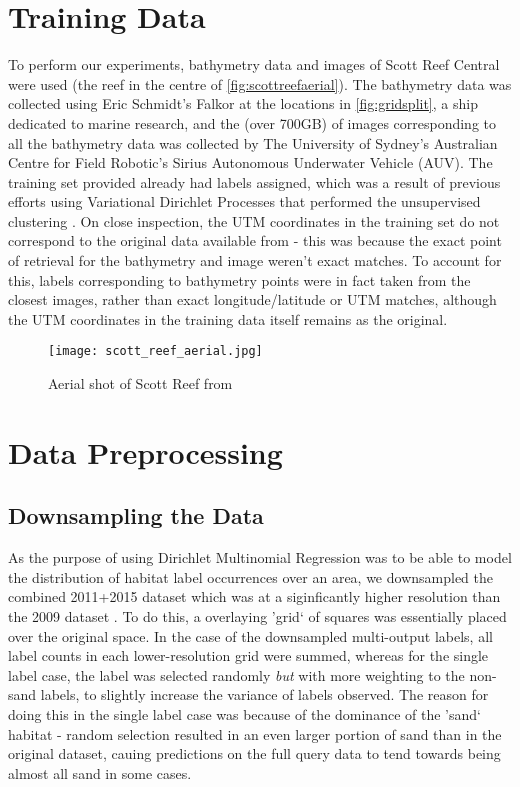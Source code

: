 \section{Training Data}
To perform our experiments, bathymetry data and images of Scott Reef Central were used (the reef in the centre of \autoref{fig:scottreefaerial}). The bathymetry data was collected using Eric Schmidt's Falkor at the locations in \autoref{fig:gridsplit}, a ship dedicated to marine research, and the (over 700GB) of images corresponding to all the bathymetry data was collected by The University of Sydney's Australian Centre for Field Robotic's Sirius Autonomous Underwater Vehicle (AUV). The training set provided already had labels assigned, which was a result of previous efforts using Variational Dirichlet Processes that performed the unsupervised clustering \citep{steinberg11}.  On close inspection, the UTM coordinates in the training set do not correspond to the original data available from \cite{squidle} - this was because the exact point of retrieval for the bathymetry and image weren't exact matches. To account for this, labels corresponding to bathymetry points were in fact taken from the closest images, rather than exact longitude/latitude or UTM matches, although the UTM coordinates in the training data itself remains as the original.


\begin{figure}
    \texttt{[image: scott\_reef\_aerial.jpg]}
    \caption{Aerial shot of Scott Reef from \cite{NASA:SRI}}
    \label{fig:scottreefaerial}
\end{figure}

\section{Data Preprocessing}

\subsection{Downsampling the Data}
As the purpose of using Dirichlet Multinomial Regression was to be able to model the distribution of habitat label occurrences over an area, we downsampled the combined 2011+2015 dataset which was at a siginficantly higher resolution than the 2009 dataset . To do this, a overlaying 'grid` of squares was essentially placed over the original space. In the case of the downsampled multi-output labels, all label counts in each lower-resolution grid were summed, whereas for the single label case, the label was selected randomly \textit{but} with more weighting to the non-sand labels, to slightly increase the variance of labels observed. The reason for doing this in the single label case was because of the dominance of the 'sand` habitat - random selection resulted in an even larger portion of sand than in the original dataset, cauing predictions on the full query data to tend towards being almost all sand in some cases.

